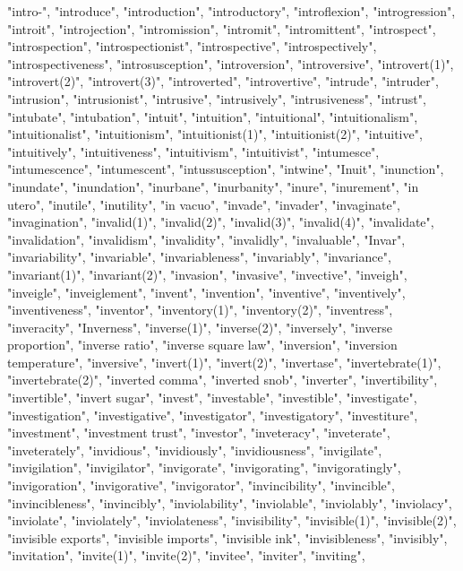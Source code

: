 "intro-",
"introduce",
"introduction",
"introductory",
"introflexion",
"introgression",
"introit",
"introjection",
"intromission",
"intromit",
"intromittent",
"introspect",
"introspection",
"introspectionist",
"introspective",
"introspectively",
"introspectiveness",
"introsusception",
"introversion",
"introversive",
"introvert(1)",
"introvert(2)",
"introvert(3)",
"introverted",
"introvertive",
"intrude",
"intruder",
"intrusion",
"intrusionist",
"intrusive",
"intrusively",
"intrusiveness",
"intrust",
"intubate",
"intubation",
"intuit",
"intuition",
"intuitional",
"intuitionalism",
"intuitionalist",
"intuitionism",
"intuitionist(1)",
"intuitionist(2)",
"intuitive",
"intuitively",
"intuitiveness",
"intuitivism",
"intuitivist",
"intumesce",
"intumescence",
"intumescent",
"intussusception",
"intwine",
"Inuit",
"inunction",
"inundate",
"inundation",
"inurbane",
"inurbanity",
"inure",
"inurement",
"in utero",
"inutile",
"inutility",
"in vacuo",
"invade",
"invader",
"invaginate",
"invagination",
"invalid(1)",
"invalid(2)",
"invalid(3)",
"invalid(4)",
"invalidate",
"invalidation",
"invalidism",
"invalidity",
"invalidly",
"invaluable",
"Invar",
"invariability",
"invariable",
"invariableness",
"invariably",
"invariance",
"invariant(1)",
"invariant(2)",
"invasion",
"invasive",
"invective",
"inveigh",
"inveigle",
"inveiglement",
"invent",
"invention",
"inventive",
"inventively",
"inventiveness",
"inventor",
"inventory(1)",
"inventory(2)",
"inventress",
"inveracity",
"Inverness",
"inverse(1)",
"inverse(2)",
"inversely",
"inverse proportion",
"inverse ratio",
"inverse square law",
"inversion",
"inversion temperature",
"inversive",
"invert(1)",
"invert(2)",
"invertase",
"invertebrate(1)",
"invertebrate(2)",
"inverted comma",
"inverted snob",
"inverter",
"invertibility",
"invertible",
"invert sugar",
"invest",
"investable",
"investible",
"investigate",
"investigation",
"investigative",
"investigator",
"investigatory",
"investiture",
"investment",
"investment trust",
"investor",
"inveteracy",
"inveterate",
"inveterately",
"invidious",
"invidiously",
"invidiousness",
"invigilate",
"invigilation",
"invigilator",
"invigorate",
"invigorating",
"invigoratingly",
"invigoration",
"invigorative",
"invigorator",
"invincibility",
"invincible",
"invincibleness",
"invincibly",
"inviolability",
"inviolable",
"inviolably",
"inviolacy",
"inviolate",
"inviolately",
"inviolateness",
"invisibility",
"invisible(1)",
"invisible(2)",
"invisible exports",
"invisible imports",
"invisible ink",
"invisibleness",
"invisibly",
"invitation",
"invite(1)",
"invite(2)",
"invitee",
"inviter",
"inviting",
